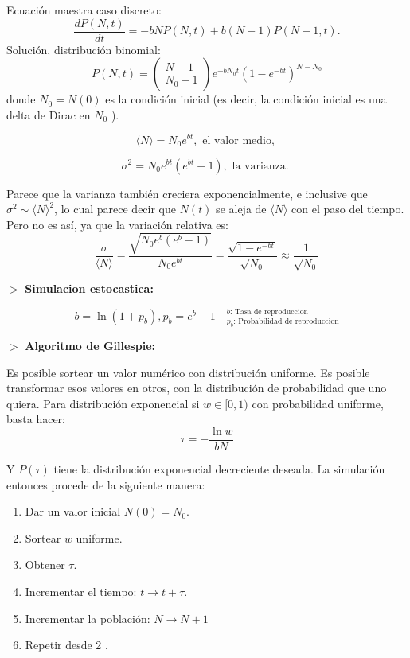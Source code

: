 \documentclass[%
 reprint,
 amsmath,amssymb,
 aps,
]{revtex4-1}
\begin{document}
Ecuación maestra caso discreto:
$$
  \frac{d P(N, t)}{d t}=-b N P(N, t)+b(N-1) P(N-1, t) .
$$
Solución, distribución binomial: 
$$
P(N, t)=\left(\begin{array}{c}
N-1 \\
N_{0}-1
\end{array}\right) e^{-b N_{0} t}\left(1-e^{-b t}\right)^{N-N_{0}}
$$
donde $N_{0}=N(0)$ es la condición inicial (es decir, la condición inicial es una delta de Dirac en $N_{0}$ ).

$$
\langle N\rangle=N_{0} e^{b t}, \text { el valor medio, }
$$

$$
\sigma^{2}=N_{0} e^{b t}\left(e^{b t}-1\right), \text { la varianza. }
$$

Parece que la varianza también creciera exponencialmente, e inclusive que $\sigma^{2} \sim\langle N\rangle^{2}$, lo cual parece decir que $N(t)$ se aleja de $\langle N\rangle$ con el paso del tiempo. Pero no es así, ya que la variación relativa es:
$$
\frac{\sigma}{\langle N\rangle}=\frac{\sqrt{N_{0} e^{b}\left(e^{b}-1\right)}}{N_{0} e^{b t}}=\frac{\sqrt{1-e^{- b{t} }}}{\sqrt{N_{0}}} \approx \frac{1}{\sqrt{N_{0}}}
$$

$>$ \textbf{Simulacion estocastica:}

$$
  b=\ln \left(1+p_{b}\right), p_{b}=e^{b}-1 \quad
  ^{b \text{: Tasa de reproduccion}}
  _{p_b \text{: Probabilidad de reproduccion}}
$$


$>$ \textbf{Algoritmo de Gillespie:}

Es posible sortear un valor numérico con distribución uniforme. Es posible transformar esos valores en otros, con la distribución de probabilidad que uno quiera. Para distribución exponencial si $w \in[0,1)$ con probabilidad uniforme, basta hacer:
$$
\tau=-\frac{\ln w}{b N}
$$

Y $P(\tau)$ tiene la distribución exponencial decreciente deseada. La simulación entonces procede de la siguiente manera:

\begin{enumerate}
  \item Dar un valor inicial $N(0)=N_{0}$.
  \item Sortear $w$ uniforme.
  \item Obtener $\tau$.
  \item Incrementar el tiempo: $t \rightarrow t+\tau$.
  \item Incrementar la población: $N \rightarrow N+1$
  \item Repetir desde 2 .
\end{enumerate}
\end{document}
